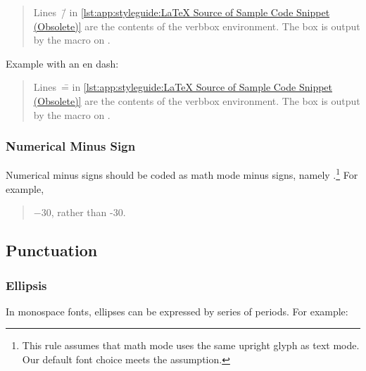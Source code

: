 \begin{quote}
\begin{fcvref}
  Lines~\=/ in
  \cref{lst:app:styleguide:LaTeX Source of Sample Code Snippet (Obsolete)}
  are the contents of the verbbox environment. The box is output
  by the \co{\\theverbbox} macro on .
\end{fcvref}
\end{quote}

Example with an en dash:

\begin{quote}
\begin{fcvref}
  Lines~\== in
  \cref{lst:app:styleguide:LaTeX Source of Sample Code Snippet (Obsolete)}
  are the contents of the verbbox environment. The box is output
  by the \co{\\theverbbox} macro on .
\end{fcvref}
\end{quote}

\subsubsection{Numerical Minus Sign}
\label{sec:app:styleguide:Numerical Minus Sign}

Numerical minus signs should be coded as math mode minus signs,
namely \qco{$-$}.\footnote{This rule assumes that math mode uses the
  same upright glyph as text mode. Our default font choice meets
  the assumption.
}
For example,

\begin{quote}
  $-30$, rather than -30.
\end{quote}

\subsection{Punctuation}
\label{sec:app:styleguide:Punctuation}

\subsubsection{Ellipsis}
\label{sec:app:styleguide:Ellipsis}

In monospace fonts, ellipses can be expressed by
series of periods. For example:

